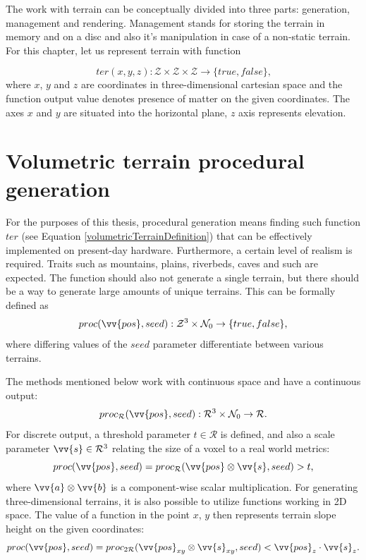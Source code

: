 
The work with terrain can be conceptually divided into three parts: generation, management and rendering. Management stands for storing the terrain in memory and on a disc and also it's manipulation in case of a non-static terrain. For this chapter, let us represent terrain with function

\begin{equation}\label{volumetricTerrainDefinition}
	ter(x,y,z) : \mathcal{Z} \times \mathcal{Z} \times \mathcal{Z} \rightarrow \{true, false\} \text{,}
\end{equation}
where $x$, $y$ and $z$ are coordinates in three-dimensional cartesian space and the function output value denotes presence of matter on the given coordinates. The axes $x$ and $y$ are situated into the horizontal plane, $z$ axis represents elevation.

\section{Volumetric terrain procedural generation} \label{sect:procGenPrinciples}
For the purposes of this thesis, procedural generation means finding such function $ter$ (see Equation \ref{volumetricTerrainDefinition}) that can be effectively implemented on present-day hardware. Furthermore, a certain level of realism is required. Traits such as mountains, plains, riverbeds, caves and such are expected. The function should also not generate a single terrain, but there should be a way to generate large amounts of unique terrains. This can be formally defined as
\begin{equation}
	proc(\vv{pos}, seed): \mathcal{Z}^3 \times \mathcal{N}_0 \rightarrow \{true, false\} \text{,}
\end{equation}
where differing values of the $seed$ parameter differentiate between various terrains.

The methods mentioned below work with continuous space and have a continuous output:
\begin{equation}
	proc_\mathcal{R}(\vv{pos}, seed): \mathcal{R}^3 \times \mathcal{N}_0 \rightarrow \mathcal{R} \text{.}
\end{equation}
For discrete output, a threshold parameter $t \in \mathcal{R}$ is defined, and also a scale parameter $\vv{s} \in \mathcal{R}^3$ relating the size of a voxel to a real world metrics:
\begin{equation}
	proc(\vv{pos}, seed) = proc_\mathcal{R}(\vv{pos} \otimes \vv{s}, seed) > t \text{,}
\end{equation}
where $\vv{a} \otimes \vv{b}$ is a component-wise scalar multiplication. For generating three-dimensional terrains, it is also possible to utilize functions working in 2D space. The value of a function in the point $x$, $y$ then represents terrain slope height on the given coordinates:
\begin{equation}
	proc(\vv{pos}, seed) = proc_{2\mathcal{R}}(\vv{pos}_{xy} \otimes \vv{s}_{xy}, seed) < \vv{pos}_z \cdot \vv{s}_z \text{.}
\end{equation}

